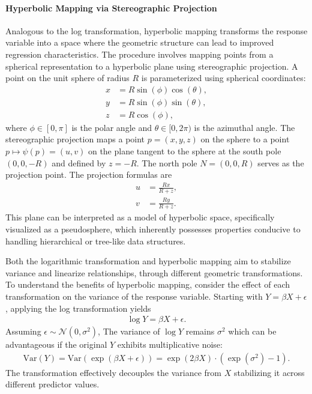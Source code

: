 \paragraph{Hyperbolic Mapping via Stereographic Projection}
Analogous to the log transformation, hyperbolic mapping transforms the response variable into a space where the geometric structure can lead to improved regression characteristics.
The procedure involves mapping points from a spherical representation to a hyperbolic plane using stereographic projection.
A point on the unit sphere of radius $R$ is parameterized using spherical coordinates:
\begin{align*}
    x &= R\sin(\phi)\cos(\theta), \\
    y &= R\sin(\phi)\sin(\theta), \\
    z &= R\cos(\phi),
\end{align*}
where $\phi \in [0, \pi]$ is the polar angle and $\theta \in [0, 2\pi)$ is the azimuthal angle.
The stereographic projection maps a point $p = (x, y, z)$ on the sphere to a point $p \mapsto \psi(p) = (u, v)$ on the plane tangent to the sphere at the south pole $(0, 0, -R)$ and defined by $z = -R$.
The north pole $N = (0, 0, R)$ serves as the projection point.
The projection formulas are
\begin{align*}
    u &= \frac{Rx}{R + z}, \\
    v &= \frac{Ry}{R + z}.
\end{align*}
This plane can be interpreted as a model of hyperbolic space, specifically visualized as a pseudosphere, which inherently possesses properties conducive to handling hierarchical or tree-like data structures.

Both the logarithmic transformation and hyperbolic mapping aim to stabilize variance and linearize relationships, through different geometric transformations. 
To understand the benefits of hyperbolic mapping, consider the effect of each transformation on the variance of the response variable.
Starting with $Y = \beta X + \epsilon$, applying the log transformation yields
\begin{align*}
    \log Y = \beta X + \epsilon.
\end{align*}
Assuming $\epsilon \sim \mathcal{N}(0, \sigma^2)$, The variance of $\log Y$ remains $\sigma^2$ which can be advantageous if the original $Y$ exhibits multiplicative noise:
\begin{align*}
    \mathrm{Var}(Y) = \mathrm{Var}(\exp(\beta X + \epsilon)) = \exp(2\beta X) \cdot \left( \exp(\sigma^2) - 1 \right).
\end{align*}
The transformation effectively decouples the variance from $X$ stabilizing it across different predictor values.

